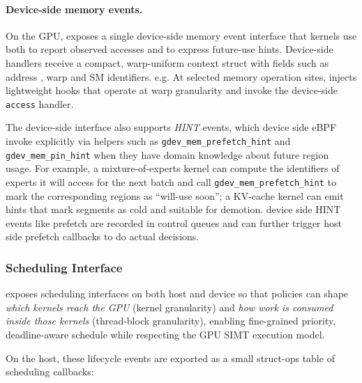 \paragraph{Device-side memory events.}

On the GPU, \sys exposes a single device-side memory event interface that kernels
use both to report observed accesses and to express future-use hints. Device-side
handlers receive a compact, warp-uniform context struct with fields such as address , warp and SM identifiers. e.g. At selected memory operation sites, \sys injects lightweight hooks that operate at
warp granularity and invoke the device-side \texttt{access} handler.

The device-side interface also supports \emph{HINT} events, which device side eBPF 
invoke explicitly via helpers such as \texttt{gdev\_mem\_prefetch\_hint} and \texttt{gdev\_mem\_pin\_hint} when they have domain knowledge about future region usage. For
example, a mixture-of-experts kernel can compute the identifiers of experts it
will access for the next batch and call \texttt{gdev\_mem\_prefetch\_hint} to mark
the corresponding regions as ``will-use soon'';
a KV-cache kernel can emit hints that mark segments as cold and suitable for
demotion. device side HINT events like prefetch are recorded in control queues and can further trigger host side prefetch callbacks to do actual decisions.

\subsubsection{Scheduling Interface}
\label{sec:design-sched}

\sys exposes scheduling interfaces on both host and device so that policies can shape
\emph{which kernels reach the GPU} (kernel granularity) and \emph{how work is consumed inside those kernels} (thread-block granularity), enabling fine-grained priority, deadline-aware schedule while respecting the GPU SIMT execution model.

On the host, these lifecycle events are exported as a small struct-ops table of
scheduling callbacks:

